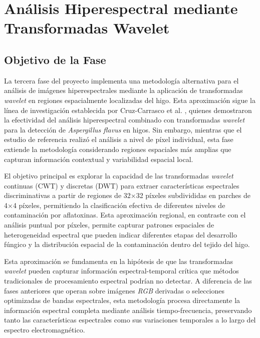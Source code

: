\section{Análisis Hiperespectral mediante Transformadas Wavelet}

\subsection{Objetivo de la Fase}

La tercera fase del proyecto implementa una metodología alternativa para el análisis de imágenes hiperespectrales mediante la aplicación de transformadas \emph{wavelet} en regiones espacialmente localizadas del higo. Esta aproximación sigue la línea de investigación establecida por Cruz-Carrasco et al. \cite{agriengineering6040225}, quienes demostraron la efectividad del análisis hiperespectral combinado con transformadas \emph{wavelet} para la detección de \emph{Aspergillus flavus} en higos. Sin embargo, mientras que el estudio de referencia realizó el análisis a nivel de píxel individual, esta fase extiende la metodología considerando regiones espaciales más amplias que capturan información contextual y variabilidad espacial local.

\vspace{5mm}

El objetivo principal es explorar la capacidad de las transformadas \emph{wavelet} continuas (CWT) y discretas (DWT) para extraer características espectrales discriminativas a partir de regiones de 32×32 píxeles subdivididas en parches de 4×4 píxeles, permitiendo la clasificación efectiva de diferentes niveles de contaminación por aflatoxinas. Esta aproximación regional, en contraste con el análisis puntual por píxeles, permite capturar patrones espaciales de heterogeneidad espectral que pueden indicar diferentes etapas del desarrollo fúngico y la distribución espacial de la contaminación dentro del tejido del higo.

\vspace{5mm}

Esta aproximación se fundamenta en la hipótesis de que las transformadas \emph{wavelet} pueden capturar información espectral-temporal crítica que métodos tradicionales de procesamiento espectral podrían no detectar. A diferencia de las fases anteriores que operan sobre imágenes \emph{RGB} derivadas o selecciones optimizadas de bandas espectrales, esta metodología procesa directamente la información espectral completa mediante análisis tiempo-frecuencia, preservando tanto las características espectrales como sus variaciones temporales a lo largo del espectro electromagnético.

